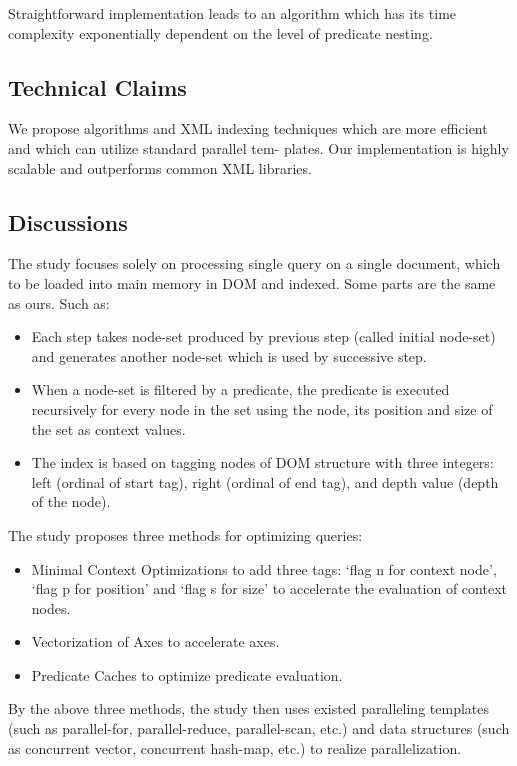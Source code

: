 \documentclass{paper}
\begin{document}
Straightforward implementation leads to an algorithm which has its
time complexity exponentially dependent on the level of predicate
nesting. 

\subsection{Technical Claims}

We propose algorithms and XML indexing techniques which are more
efficient and which can utilize standard parallel tem- plates. Our
implementation is highly scalable and outperforms common XML
libraries.

\subsection{Discussions}


The study focuses solely on processing single query on a single
document, which to be loaded into main memory in DOM and
indexed. Some parts are the same as ours. Such as:

\begin{itemize}  
\item Each step takes node-set produced by previous step (called initial
node-set) and generates another node-set which is used by successive
step.
\item When a node-set is filtered by a predicate, the predicate is executed
recursively for every node in the set using the node, its position
and size of the set as context values. 
\item The index is based on tagging nodes of DOM structure with three 
integers: left (ordinal of start tag), right (ordinal of end tag), and 
depth value (depth of the node).
\end{itemize}


The study proposes three methods for optimizing queries:
\begin{itemize}
	\item Minimal Context Optimizations to add three tags: `flag n for context 
	      node', `flag p for position' and `flag s for size' to accelerate the 
	      evaluation of context nodes.
	\item Vectorization of Axes to accelerate axes. 
	\item Predicate Caches to optimize predicate evaluation.
\end{itemize}

By the above three methods, the study then uses existed paralleling 
templates (such as parallel-for, 
parallel-reduce, parallel-scan, etc.) and data structures (such as concurrent vector, 
concurrent hash-map, etc.) to realize parallelization.
\end{document}
